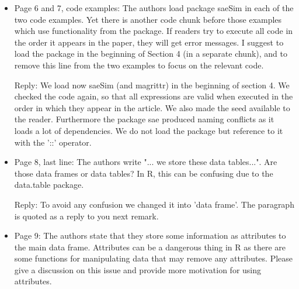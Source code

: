 \documentclass[11pt]{article}
\begin{document}
\begin{itemize}
\item
	Page 6 and 7, code examples: The authors load package saeSim in each of the two code examples. Yet there is another code chunk before those examples which use functionality from the package. If readers try to execute all code in the order it appears in the paper, they will get error messages. I suggest to load the package in the beginning of Section 4 (in a separate chunk), and to remove this line from the two examples to focus on the relevant code.
	
	Reply: We load now saeSim (and magrittr) in the beginning of section 4. We checked the code again, so that all expressions are valid when executed in the order in which they appear in the article. We also made the seed available to the reader. Furthermore the package sae produced naming conflicts as it loads a lot of dependencies. We do not load the package but reference to it with the '::' operator.

\item
	Page 8, last line: The authors write "... we store these data tables...". Are those data frames or data tables? In R, this can be confusing due to the data.table package.
	
	Reply: To avoid any confusion we changed it into 'data frame'. The paragraph is quoted as a reply to you next remark.

\item
	Page 9: The authors state that they store some information as attributes to the main data frame. Attributes can be a dangerous thing in R as there are some functions for manipulating data that may remove any attributes. Please give a discussion on this issue and provide more motivation for using attributes.
	

\end{itemize}
\end{document}
